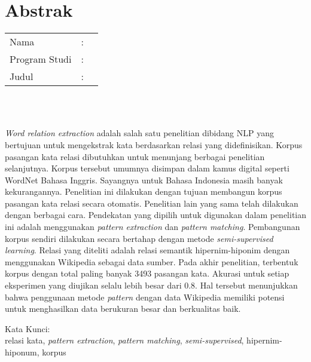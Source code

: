 %
%
%

\chapter*{Abstrak}

\vspace*{0.2cm}

\noindent \begin{tabular}{l l p{10cm}}
	Nama&: & \penulis \\
	Program Studi&: & \program \\
	Judul&: & \judul \\
\end{tabular} \\ 

\vspace*{0.5cm}

\noindent 
\\ \textit{Word relation extraction} adalah salah satu penelitian dibidang NLP yang bertujuan untuk mengekstrak kata berdasarkan relasi yang didefinisikan. Korpus pasangan kata relasi dibutuhkan untuk menunjang berbagai penelitian selanjutnya. Korpus tersebut umumnya disimpan dalam kamus digital seperti WordNet Bahasa Inggris. Sayangnya untuk Bahasa Indonesia masih banyak kekurangannya. Penelitian ini dilakukan dengan tujuan membangun korpus pasangan kata relasi secara otomatis. Penelitian lain yang sama telah dilakukan dengan berbagai cara. Pendekatan yang dipilih untuk digunakan dalam penelitian ini adalah menggunakan \textit{pattern extraction} dan \textit{pattern matching}. Pembangunan korpus sendiri dilakukan secara bertahap dengan metode \textit{semi-supervised learning}. Relasi yang diteliti adalah relasi semantik hipernim-hiponim dengan menggunakan Wikipedia sebagai data sumber. Pada akhir penelitian, terbentuk korpus dengan total paling banyak 3493 pasangan kata. Akurasi untuk setiap eksperimen yang diujikan selalu lebih besar dari 0.8. Hal tersebut menunjukkan bahwa penggunaan metode \textit{pattern} dengan data Wikipedia memiliki potensi untuk menghasilkan data berukuran besar dan berkualitas baik.

\vspace*{0.2cm}

\noindent Kata Kunci: \\ 
\noindent relasi kata, \textit{pattern extraction}, \textit{pattern matching}, \textit{semi-supervised}, hipernim-hiponum, korpus\\ 

\newpage
